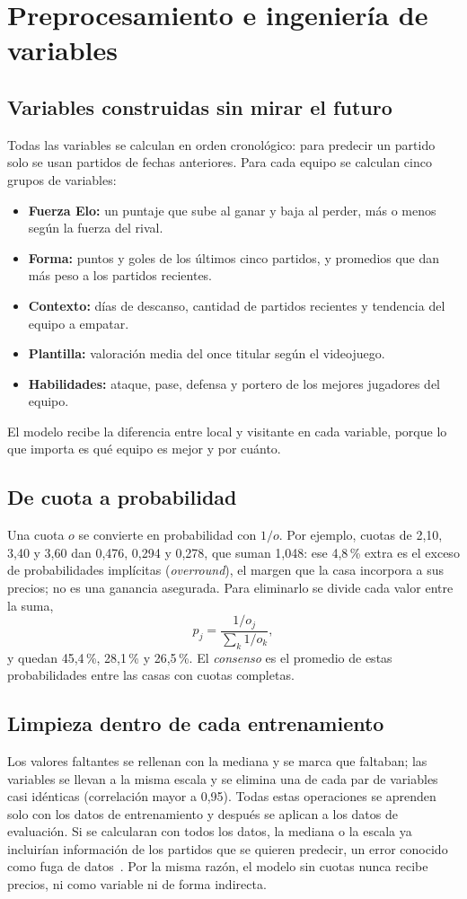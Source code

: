 \documentclass[conference]{IEEEtran}
\begin{document}
\section{Preprocesamiento e ingeniería de variables}
\label{sec:prep}
\subsection{Variables construidas sin mirar el futuro}
Todas las variables se calculan en orden cronológico: para predecir un partido solo se usan partidos de fechas anteriores. Para cada equipo se calculan cinco grupos de variables:
\begin{itemize}
\item \textbf{Fuerza Elo:} un puntaje que sube al ganar y baja al perder, más o menos según la fuerza del rival.
\item \textbf{Forma:} puntos y goles de los últimos cinco partidos, y promedios que dan más peso a los partidos recientes.
\item \textbf{Contexto:} días de descanso, cantidad de partidos recientes y tendencia del equipo a empatar.
\item \textbf{Plantilla:} valoración media del once titular según el videojuego.
\item \textbf{Habilidades:} ataque, pase, defensa y portero de los mejores jugadores del equipo.
\end{itemize}
El modelo recibe la diferencia entre local y visitante en cada variable, porque lo que importa es qué equipo es mejor y por cuánto.

\subsection{De cuota a probabilidad}
Una cuota $o$ se convierte en probabilidad con $1/o$. Por ejemplo, cuotas de 2,10, 3,40 y 3,60 dan 0,476, 0,294 y 0,278, que suman 1,048: ese 4,8\,\% extra es el exceso de probabilidades implícitas (\emph{overround}), el margen que la casa incorpora a sus precios; no es una ganancia asegurada. Para eliminarlo se divide cada valor entre la suma,
\begin{equation}
p_j=\frac{1/o_j}{\sum_k 1/o_k},
\label{eq:odds}
\end{equation}
y quedan 45,4\,\%, 28,1\,\% y 26,5\,\%. El \emph{consenso} es el promedio de estas probabilidades entre las casas con cuotas completas.

\subsection{Limpieza dentro de cada entrenamiento}
Los valores faltantes se rellenan con la mediana y se marca que faltaban; las variables se llevan a la misma escala y se elimina una de cada par de variables casi idénticas (correlación mayor a 0,95). Todas estas operaciones se aprenden solo con los datos de entrenamiento y después se aplican a los datos de evaluación. Si se calcularan con todos los datos, la mediana o la escala ya incluirían información de los partidos que se quieren predecir, un error conocido como fuga de datos~\cite{zheng2018}. Por la misma razón, el modelo sin cuotas nunca recibe precios, ni como variable ni de forma indirecta.
\end{document}
